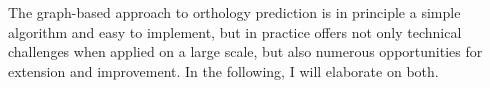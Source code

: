 The graph-based approach to orthology prediction is in principle a simple
algorithm and easy to implement, but in practice offers not only technical
challenges when applied on a large scale, but also numerous opportunities for
extension and improvement. In the following, I will elaborate on both.
